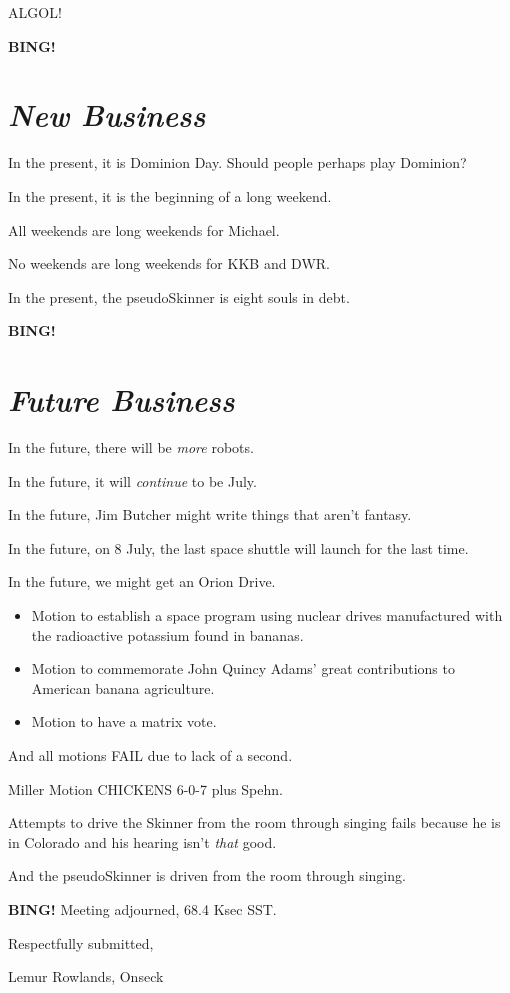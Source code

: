 \documentclass[10pt]{article}
\newcommand{\bing}{{\bf BING!} }
\newcommand{\goto}[1]{\bing \vskip 12pt \section*{{\em{#1}}}}
\newcommand{\ps}{ plus Spehn\xspace}
\newcommand{\onseck}{Lemur Rowlands, Onseck}
\begin{document}
ALGOL!

\goto{New Business}

In the present, it is Dominion Day.  Should people perhaps play Dominion?

In the present, it is the beginning of a long weekend.

All weekends are long weekends for Michael.

No weekends are long weekends for KKB and DWR.

In the present, the pseudoSkinner is eight souls in debt.

\goto{Future Business}

In the future, there will be \emph{more} robots.

In the future, it will \emph{continue} to be July.

In the future, Jim Butcher might write things that aren't fantasy.

In the future, on 8 July, the last space shuttle will launch for the last time.

In the future, we might get an Orion Drive.

\begin{itemize}
  \item Motion to establish a space program using nuclear drives manufactured with the
     radioactive potassium found in bananas.

  \item Motion to commemorate John Quincy Adams' great contributions to American
     banana agriculture.

  \item Motion to have a matrix vote.
\end{itemize}

And all motions FAIL due to lack of a second.

Miller Motion CHICKENS 6-0-7\ps.

Attempts to drive the Skinner from the room through singing fails because he
is in Colorado and his hearing isn't \emph{that} good.

And the pseudoSkinner is driven from the room through singing.

\bing
\noindent
Meeting adjourned, 68.4 Ksec SST.

\vspace{18pt}

\centerline{Respectfully submitted,}
\centerline{\onseck}
\end{document}
